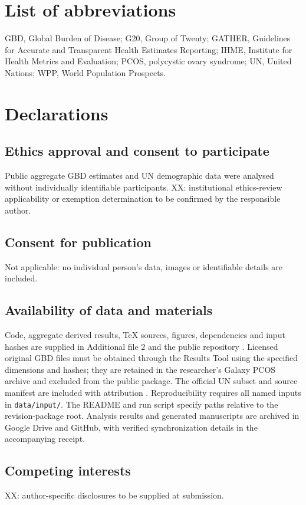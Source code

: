 \documentclass[11pt,a4paper]{article}
\begin{document}
\section*{List of abbreviations}
GBD, Global Burden of Disease; G20, Group of Twenty; GATHER, Guidelines for Accurate and Transparent Health Estimates Reporting; IHME, Institute for Health Metrics and Evaluation; PCOS, polycystic ovary syndrome; UN, United Nations; WPP, World Population Prospects.

\section*{Declarations}
\subsection*{Ethics approval and consent to participate}
Public aggregate GBD estimates and UN demographic data were analysed without individually identifiable participants. XX: institutional ethics-review applicability or exemption determination to be confirmed by the responsible author.
\subsection*{Consent for publication}
Not applicable: no individual person's data, images or identifiable details are included.
\subsection*{Availability of data and materials}
Code, aggregate derived results, TeX sources, figures, dependencies and input hashes are supplied in Additional file 2 and the public repository \cite{repository}. Licensed original GBD files must be obtained through the Results Tool \cite{results} using the specified dimensions and hashes; they are retained in the researcher's Galaxy PCOS archive and excluded from the public package. The official UN subset and source manifest are included with attribution \cite{wpp2024}. Reproducibility requires all named inputs in \texttt{data/input/}. The README and run script specify paths relative to the revision-package root. Analysis results and generated manuscripts are archived in Google Drive and GitHub, with verified synchronization details in the accompanying receipt.
\subsection*{Competing interests}
XX: author-specific disclosures to be supplied at submission.
\end{document}
